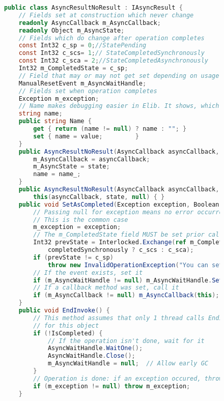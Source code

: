 \begin{figure}[!hbp]	
\begin{lstlisting}[language=cs]
public class AsyncResultNoResult : IAsyncResult {
	// Fields set at construction which never change 
	readonly AsyncCallback m_AsyncCallback;
	readonly Object m_AsyncState;
	// Fields which do change after operation completes
	const Int32 c_sp = 0;//StatePending
	const Int32 c_scs= 1;// StateCompletedSynchronously
	const Int32 c_sca = 2;//StateCompletedAsynchronously
	Int32 m_CompletedState = c_sp;
	// Field that may or may not get set depending on usage
	ManualResetEvent m_AsyncWaitHandle;
	// Fields set when operation completes
	Exception m_exception;
	// Name makes debugging easier in Elib. It shows, which command was used.
	string name;
	public string Name { 
		get { return (name != null) ? name : ""; } 
		set { name = value; 		} 
	}
	public AsyncResultNoResult(AsyncCallback asyncCallback, Object state, string name_) {
		m_AsyncCallback = asyncCallback;
		m_AsyncState = state;
		name = name_;
	}
	public AsyncResultNoResult(AsyncCallback asyncCallback, Object state) : 
		this(asyncCallback, state, null) { }
	public void SetAsCompleted(Exception exception, Boolean completedSynchronously) {
		// Passing null for exception means no error occurred. 
		// This is the common case
		m_exception = exception;
		// The m_CompletedState field MUST be set prior calling the callback
		Int32 prevState = Interlocked.Exchange(ref m_CompletedState, 
			completedSynchronously ? c_scs : c_sca);
		if (prevState != c_sp)
			throw new InvalidOperationException("You can set a result only once");
		// If the event exists, set it
		if (m_AsyncWaitHandle != null) m_AsyncWaitHandle.Set();
		// If a callback method was set, call it
		if (m_AsyncCallback != null) m_AsyncCallback(this);
	}
	public void EndInvoke() {
		// This method assumes that only 1 thread calls EndInvoke 
		// for this object
		if (!IsCompleted) {
			// If the operation isn't done, wait for it
			AsyncWaitHandle.WaitOne();
			AsyncWaitHandle.Close();
			m_AsyncWaitHandle = null;  // Allow early GC
		}      
		// Operation is done: if an exception occured, throw it
		if (m_exception != null) throw m_exception;
	}


\end{lstlisting}
\end{figure}
